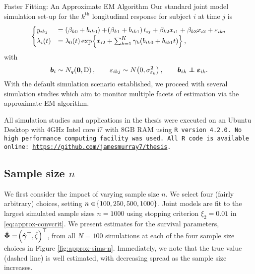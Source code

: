 \begin{chapter}{\label{cha:approx}Faster Fitting: An Approximate EM Algorithm}
  Our standard joint model simulation set-up for the $k^\mathrm{th}$ longitudinal response for subject $i$ at time $j$ is 
  \begin{equation}
      \begin{aligned}
          \begin{cases}
              y_{ikj} &= \left(\beta_{k0} + b_{ik0}\right) + \lb\beta_{k1} + b_{ik1}\rb t_{ij} + \beta_{k2}x_{i1} + \beta_{k3}x_{i2} + \varepsilon_{ikj}\\
              \lambda_i(t) &= \lo\lb t\rb\exp\lbr x_{i2}\time\zeta + \Sk\gamma_k\lb b_{ik0} + b_{ik1}t\rb\rbr,
          \end{cases}
      \end{aligned}
  \end{equation}
  with
  \begin{equation*}
      \bm{b}_i\sim N_q\!\left( \bm{0},\mathrm{D}\right),\qquad\varepsilon_{ikj}\sim N\!\left(0, \sigma_{\varepsilon_k}^2\right),\qquad \bm{b}_i{_k}\perp\!\!\!\!\perp\bm{\varepsilon}_{ik}.
  \end{equation*}
  With the default simulation scenario established, we proceed with several simulation studies which aim to monitor multiple facets of estimation via the approximate EM algorithm.

  All simulation studies and applications in the thesis were executed on an Ubuntu Desktop with 4GHz Intel core i7 with 8GB RAM using \tt{R} version 4.2.0. No high performance computing facility was used. All \tt{R} code is available online: \url{https://github.com/jamesmurray7/thesis}.

  \subsection{Sample size \texorpdfstring{$n$}{n}}\label{sec:approx-sims-n}
  We first consider the impact of varying sample size $n$. We select four (fairly arbitrary) choices, setting $n\in\!\left\{100,250,500,1000\right\}$. Joint models are fit to the largest simulated sample sizes $n=1000$ using stopping criterion $\xi_2=0.01$ in \eqref{eq:approx-convcrit}. We present estimates for the survival parameters, $\hat{\bm{\Phi}}=\!\left(\hat{\bm{\gamma}}^\top,\hat{\zeta}\right)^\top$, from all $N=100$ simulations at each of the four sample size choices in Figure \ref{fig:approx-sims-n}. Immediately, we note that the true value (dashed line) is well estimated, with decreasing spread as the sample size increases. 
  

\end{chapter}
